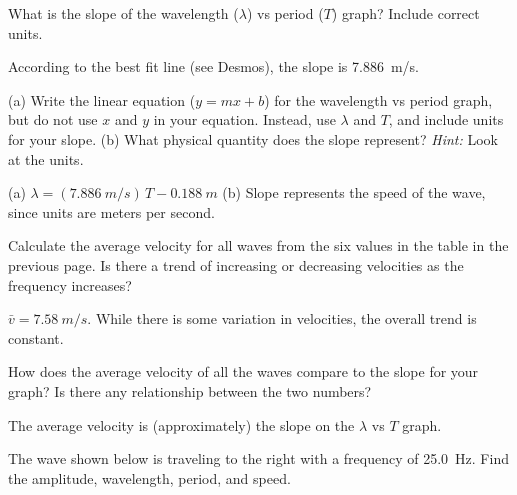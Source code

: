 \documentclass[]{exam}
\begin{document}
\begin{questions}



\question
What is the slope of the wavelength ($\lambda$) vs period ($T$) graph? Include correct units. 

\begin{solutionorbox}[2cm]
According to the best fit line (see Desmos), the slope is \SI{7.886}{m/s}.
\end{solutionorbox}

\question
(a) Write the linear equation ($y = mx + b$) for the wavelength vs period graph, but do not use $x$ and $y$ in your equation. Instead, use $\lambda$ and $T$, and include units for your slope. (b) What physical quantity does the slope represent? \textit{Hint:} Look at the units.

\ifprintanswers
{\color{red} (a) \quad $\lambda = (\SI{7.886}{m/s})\, T - \SI{0.188}{m}$ \quad (b) Slope represents the speed of the wave, since units are meters per second.
}
\else
\fillwithlines{14mm}
\fi

\question
Calculate the average velocity for all waves from the six values in the table in the previous page. Is there a trend of increasing or decreasing velocities as the frequency increases?

\ifprintanswers
{\color{red} $\bar{v} = \SI{7.58}{m/s}$. While there is some variation in velocities, the overall trend is constant.

\vspace{-5mm}
}
\fi

\fillwithlines{8mm}

\question
How does the average velocity of all the waves compare to the slope for your graph? Is there any relationship between the two numbers?

\ifprintanswers
{\color{red}
The average velocity is (approximately) the slope on the $\lambda$ vs $T$ graph.

\vspace{-5mm}
}
\fi

\fillwithlines{8mm}


\question
The wave shown below is traveling to the right with a frequency  of \SI{25.0}{Hz}. Find the amplitude, wavelength, period, and speed.


\end{questions}
\end{document}
